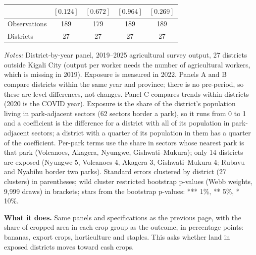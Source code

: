 \documentclass[11pt]{article}
\begin{document}
\begin{table}[H]
\begin{tabular}{lcccc}
 & $[0.124]$ & $[0.672]$ & $[0.964]$ & $[0.269]$ \\
\midrule
Observations & 189 & 179 & 189 & 189 \\
Districts & 27 & 27 & 27 & 27 \\
\bottomrule
\end{tabular}
\begin{minipage}{0.95\textwidth}\footnotesize
\textit{Notes:} District-by-year panel, 2019--2025 agricultural survey output, 27 districts outside Kigali City (output per worker needs the number of agricultural workers, which is missing in 2019). Exposure is measured in 2022. Panels A and B compare districts within the same year and province; there is no pre-period, so these are level differences, not changes. Panel C compares trends within districts (2020 is the COVID year). Exposure is the share of the district's population living in park-adjacent sectors (62 sectors border a park), so it runs from 0 to 1 and a coefficient is the difference for a district with all of its population in park-adjacent sectors; a district with a quarter of its population in them has a quarter of the coefficient. Per-park terms use the share in sectors whose nearest park is that park (Volcanoes, Akagera, Nyungwe, Gishwati--Mukura); only 14 districts are exposed (Nyungwe 5, Volcanoes 4, Akagera 3, Gishwati--Mukura 4; Rubavu and Nyabihu border two parks). Standard errors clustered by district (27 clusters) in parentheses; wild cluster restricted bootstrap p-values (Webb weights, 9,999 draws) in brackets; stars from the bootstrap p-values: *** 1\%, ** 5\%, * 10\%.
\end{minipage}
\end{table}
\textbf{What it does.} Same panels and specifications as the previous page, with the share of cropped area in each crop group as the outcome, in percentage points: bananas, export crops, horticulture and staples. This asks whether land in exposed districts moves toward cash crops.
\end{document}

